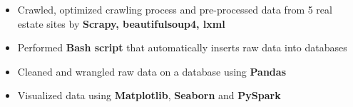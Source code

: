 \begin{itemize}[leftmargin=*]
\vspace{-5pt}

\hspace{3mm}
\vspace{-1mm}
\begin{itemize}
    \item Crawled, optimized crawling process and pre-processed data from 5 real estate sites by \textbf{Scrapy, beautifulsoup4, lxml}
    \item Performed \textbf{Bash script} that automatically inserts raw data into databases
    \item Cleaned and wrangled raw data on a database using \textbf{Pandas}
    \item Visualized data using \textbf{Matplotlib}, \textbf{Seaborn} and \textbf{PySpark}
\end{itemize}

\end{itemize}